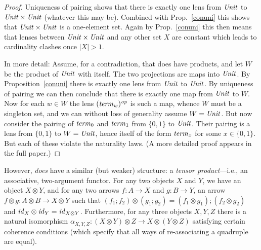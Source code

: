 \begin{defn}[$R$-similarity]
\begin{theorem}
\begin{lemma}
\begin{theorem}[No products]
\begin{proof}
Uniqueness of pairing shows that there is exactly one lens from $\mathit{Unit}$ to
$\mathit{Unit}\times \mathit{Unit}$ (whatever this may be). Combined with Prop.~\ref{conuni}
this shows that $\mathit{Unit}\times \mathit{Unit}$ is a one-element set. Again by Prop.~\ref{conuni} 
this then means that lenses 
between $\mathit{Unit}\times\mathit{Unit}$ and any other set $X$ are constant which leads to cardinality clashes once $|X|>1$. 
\iffull 

In more detail: 
  Assume, for a contradiction, that \LENS{} does have products, and let $W$
  be the 
  product of $\mathit{Unit}$ with itself. The two projections are maps into
  $\mathit{Unit}$. By Proposition~\ref{conuni} there is exactly one lens from
  $\mathit{Unit}$ to $\mathit{Unit}$. By uniqueness of pairing we can then conclude
  that there is exactly one map from $\mathit{Unit}$ to $W$. Now for each
  $w\in W$ the lens $(\mathit{term}_w)^\mathit{op}$ is such a map, whence $W$ must be a
  singleton set, and we can without loss of generality assume
  $W=\mathit{Unit}$.  But now consider the pairing of $\mathit{term}_{0}$ and
  $\mathit{term}_{1}$ from $\{0,1\}$ to $\mathit{Unit}$. Their pairing is a lens from
  $\{0,1\}$ to $W=\mathit{Unit}$, hence itself of the form $\mathit{term}_x$ for some
  $x\in\{0,1\}$. But each of these violate the naturality laws.
%
\else
(A more detailed proof
appears in the full paper.)
\fi
\end{proof}

However, \LENS{} \emph{does} have a similar (but weaker) structure: a
\emph{tensor product}---i.e., an associative, two-argument functor.
For
any two objects $X$ and $Y$, we have an object $X\otimes Y$, and for any two
arrows $f : A\rightarrow X$ and $g : B \rightarrow Y$, an arrow
$f\otimes g : A \otimes B \rightarrow X \otimes Y$ such that
$(f_1;f_2)\otimes (g_1;g_2) = (f_1 \otimes g_1) ; (f_2 \otimes g_2)$ and
$\mathit{id}_X \otimes \mathit{id}_Y = \mathit{id}_{X \otimes Y}$. Furthermore, for any three objects
$X,Y,Z$ there is a natural isomorphism $\alpha_{X,Y,Z} : (X \otimes Y)
\otimes Z \to X \otimes (Y \otimes Z)$ satisfying certain coherence
conditions (which specify that all ways of re-associating
a quadruple are equal).


\end{theorem}
\end{lemma}
\end{theorem}
\end{defn}
